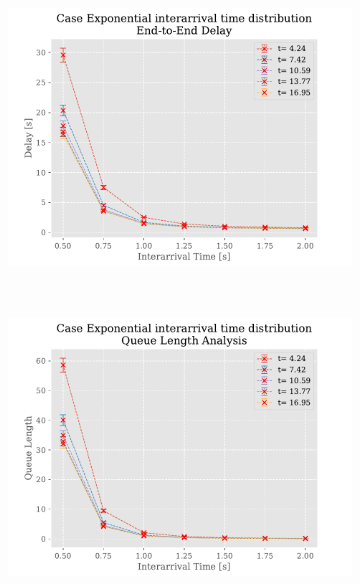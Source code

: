 \documentclass[a4paper,12pt]{article}
\begin{document}
\begin{figure}
  \centering
  \begin{subfigure}[b]{.3\textwidth}
    \includegraphics[width=\textwidth]{img/DelayP1Exp.pdf}
  \end{subfigure}
  ~
  \begin{subfigure}[b]{.3\textwidth}
    \includegraphics[width=\textwidth]{img/QueueLengthP1Exp.pdf}
  \end{subfigure}
  ~
  \begin{subfigure}[b]{.3\textwidth}

\end{subfigure}
\end{figure}
\end{document}
